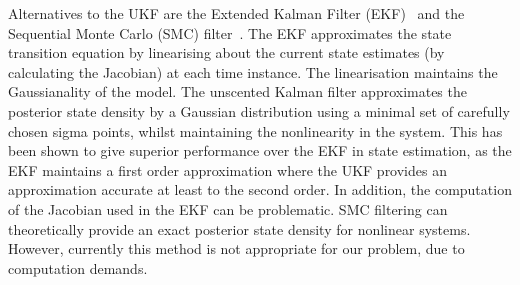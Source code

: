 \documentclass[12pt]{iopart}
\begin{document}
Alternatives to the UKF are the Extended Kalman Filter (EKF)~\cite{Haykin2001} and the Sequential Monte Carlo (SMC) filter~\cite{doucet2001}. The EKF approximates the state transition equation by linearising about the current state estimates (by calculating the Jacobian) at each time instance. The linearisation maintains the Gaussianality of the model. The unscented Kalman filter approximates the posterior state density by a Gaussian distribution using a minimal set of carefully chosen sigma points, whilst maintaining the nonlinearity in the system. This has been shown to give superior performance over the EKF in state estimation, as the EKF maintains a first order approximation where the UKF provides an approximation accurate at least to the second order. In addition, the computation of the Jacobian used in the EKF can be problematic. SMC filtering can theoretically provide an exact posterior state density for nonlinear systems. However, currently this method is not appropriate for our problem, due to computation demands. 

\end{document}
